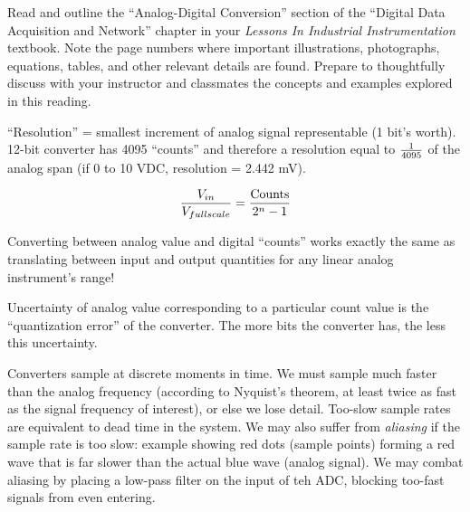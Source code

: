 

Read and outline the ``Analog-Digital Conversion'' section of the ``Digital Data Acquisition and Network'' chapter in your {\it Lessons In Industrial Instrumentation} textbook.  Note the page numbers where important illustrations, photographs, equations, tables, and other relevant details are found.  Prepare to thoughtfully discuss with your instructor and classmates the concepts and examples explored in this reading.














``Resolution'' = smallest increment of analog signal representable (1 bit's worth).  12-bit converter has 4095 ``counts'' and therefore a resolution equal to ${1 \over 4095}$ of the analog span (if 0 to 10 VDC, resolution = 2.442 mV).

$${V_{in} \over V_{fullscale}} = {\hbox{Counts} \over 2^n - 1}$$

Converting between analog value and digital ``counts'' works exactly the same as translating between input and output quantities for any linear analog instrument's range!

\vskip 10pt

Uncertainty of analog value corresponding to a particular count value is the ``quantization error'' of the converter.  The more bits the converter has, the less this uncertainty.

\vskip 10pt

Converters sample at discrete moments in time.  We must sample much faster than the analog frequency (according to Nyquist's theorem, at least twice as fast as the signal frequency of interest), or else we lose detail.  Too-slow sample rates are equivalent to dead time in the system.  We may also suffer from {\it aliasing} if the sample rate is too slow: example showing red dots (sample points) forming a red wave that is far slower than the actual blue wave (analog signal).  We may combat aliasing by placing a low-pass filter on the input of teh ADC, blocking too-fast signals from even entering. 

